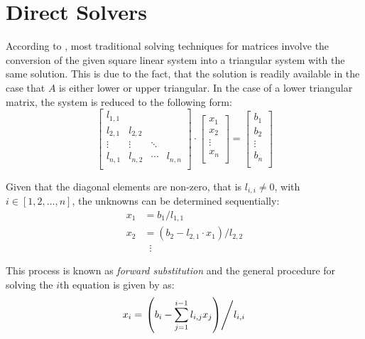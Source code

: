 \section{Direct Solvers}
\label{sec:direct_solvers}

According to \cite{golub_matrix_2013}, most traditional solving techniques for matrices involve the conversion of the given square linear system into a triangular system with the same solution. This is due to the fact, that the solution is readily available in the case that $A$ is either lower or upper triangular. In the case of a lower triangular matrix, the system is reduced to the following form:
\begin{equation}
  \left[
    \begin{array}{cccc}
      l_{1,1} &  &  & \\
      l_{2,1} & l_{2,2} &  &  \\
      \vdots& \vdots & \ddots &  \\
      l_{n,1} & l_{n,2} & \cdots & l_{n,n}\\
    \end{array}
  \right] \cdot
  \left[
    \begin{array}{c}
      x_{1} \\
      x_{2} \\
      \vdots \\
      x_{n}  \\
    \end{array}
  \right] = 
  \left[
    \begin{array}{c}
      b_{1} \\
      b_{2} \\
      \vdots \\
      b_{n}  \\
    \end{array}
  \right] 
\end{equation}

\noindent Given that the diagonal elements are non-zero, that is $l_{i,i} \neq 0$, with $i \in [1,2, \dots, n]$, the unknowns can be determined sequentially:
\begin{equation}
\begin{aligned}
    x_1 & =  b_1/l_{1,1} \\
    x_2 & =  (b_2-l_{2,1}\cdot x_1)/l_{2,2} \\
    & \;\;\vdots 
\end{aligned}
\end{equation}

\noindent This process is known as \textit{forward substitution} and the general procedure for solving the $i$th equation is given by \cite{golub_matrix_2013} as:
\begin{equation}
    x_i=\left. \left( b_i-\sum_{j=1}^{i-1}l_{i,j}x_j\right) \middle/ l_{i,i} \right.
\end{equation}

